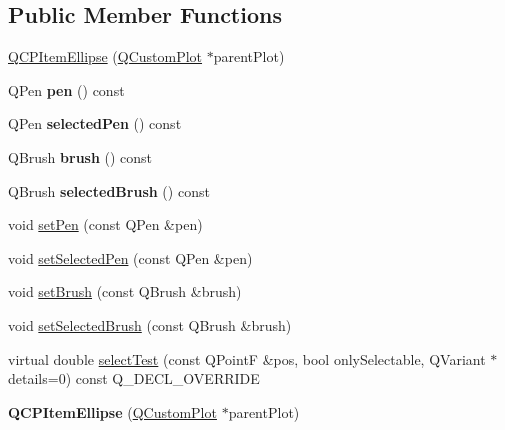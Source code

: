 \subsection*{Public Member Functions}
\begin{DoxyCompactItemize}
\item 
\hyperlink{class_q_c_p_item_ellipse_a759b77ef002515eba0263b5447ecb3fb}{Q\+C\+P\+Item\+Ellipse} (\hyperlink{class_q_custom_plot}{Q\+Custom\+Plot} $\ast$parent\+Plot)
\item 
Q\+Pen {\bfseries pen} () const \hypertarget{class_q_c_p_item_ellipse_adb67471eabaf1214c99767f1653ca0ed}{}\label{class_q_c_p_item_ellipse_adb67471eabaf1214c99767f1653ca0ed}

\item 
Q\+Pen {\bfseries selected\+Pen} () const \hypertarget{class_q_c_p_item_ellipse_ac52ab52225d238365ff3264b4b69130f}{}\label{class_q_c_p_item_ellipse_ac52ab52225d238365ff3264b4b69130f}

\item 
Q\+Brush {\bfseries brush} () const \hypertarget{class_q_c_p_item_ellipse_ac012e4fd59fdb1afb6554937bae8f7e1}{}\label{class_q_c_p_item_ellipse_ac012e4fd59fdb1afb6554937bae8f7e1}

\item 
Q\+Brush {\bfseries selected\+Brush} () const \hypertarget{class_q_c_p_item_ellipse_a0043e401a912d54ea3195bab0967b394}{}\label{class_q_c_p_item_ellipse_a0043e401a912d54ea3195bab0967b394}

\item 
void \hyperlink{class_q_c_p_item_ellipse_adb81a663ed2420fcfa011e49f678d1a6}{set\+Pen} (const Q\+Pen \&pen)
\item 
void \hyperlink{class_q_c_p_item_ellipse_a6c542fba1dc918041c583f58a50dde99}{set\+Selected\+Pen} (const Q\+Pen \&pen)
\item 
void \hyperlink{class_q_c_p_item_ellipse_a49fc74e6965834e873d027d026def798}{set\+Brush} (const Q\+Brush \&brush)
\item 
void \hyperlink{class_q_c_p_item_ellipse_a9693501cfaa43a099655c75bed0dab3f}{set\+Selected\+Brush} (const Q\+Brush \&brush)
\item 
virtual double \hyperlink{class_q_c_p_item_ellipse_ab6e2b8a29695c606c7731e498297ca29}{select\+Test} (const Q\+PointF \&pos, bool only\+Selectable, Q\+Variant $\ast$details=0) const Q\+\_\+\+D\+E\+C\+L\+\_\+\+O\+V\+E\+R\+R\+I\+DE
\item 
{\bfseries Q\+C\+P\+Item\+Ellipse} (\hyperlink{class_q_custom_plot}{Q\+Custom\+Plot} $\ast$parent\+Plot)\hypertarget{class_q_c_p_item_ellipse_a759b77ef002515eba0263b5447ecb3fb}{}\label{class_q_c_p_item_ellipse_a759b77ef002515eba0263b5447ecb3fb}


\end{DoxyCompactItemize}
